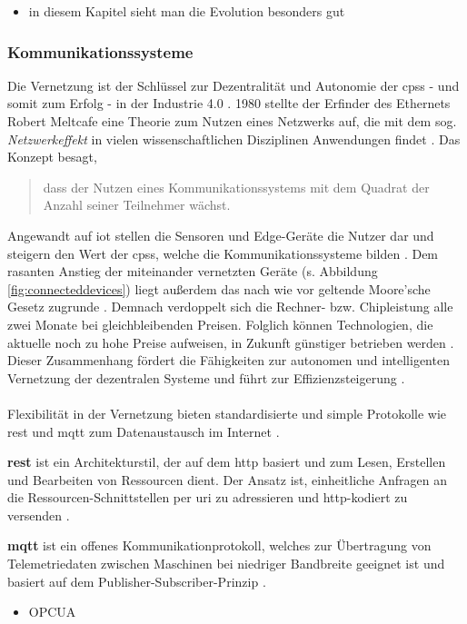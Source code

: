 \begin{itemize}
  \item in diesem Kapitel sieht man die Evolution besonders gut
\end{itemize}

\subsubsection{Kommunikationssysteme}

Die Vernetzung ist der Schlüssel zur Dezentralität und Autonomie der \ac{cpss} - und somit zum Erfolg - in der Industrie 4.0 \citep{Bauernhansl2014}. 1980 stellte der Erfinder des Ethernets Robert Meltcafe eine Theorie zum Nutzen eines Netzwerks auf, die mit dem sog. \textit{Netzwerkeffekt} in vielen wissenschaftlichen Disziplinen Anwendungen findet \citep{Lea2018}. Das Konzept besagt,

\begin{quotation}
  \glqq [...] dass der Nutzen eines Kommunikationssystems mit dem Quadrat der Anzahl seiner Teilnehmer wächst.\grqq{} \citep[S. 18]{Bauernhansl2014}
\end{quotation}

Angewandt auf \ac{iot} stellen die Sensoren und Edge-Geräte die Nutzer dar und steigern den Wert der \ac{cpss}, welche die Kommunikationssysteme bilden \citep{Lea2018}. Dem rasanten Anstieg der  miteinander vernetzten Geräte (s. Abbildung \ref{fig:connecteddevices}) liegt außerdem das nach wie vor geltende Moore'sche Gesetz zugrunde \citep{Barthelmaes2017}. Demnach verdoppelt sich die Rechner- bzw. Chipleistung alle zwei Monate bei gleichbleibenden Preisen. Folglich können Technologien, die aktuelle noch zu hohe Preise aufweisen, in Zukunft günstiger betrieben werden \citep{Bauernhansl2014}. Dieser Zusammenhang fördert die Fähigkeiten zur autonomen und intelligenten Vernetzung der dezentralen Systeme und führt zur Effizienzsteigerung \citep{Barthelmaes2017}.
\\\\
Flexibilität in der Vernetzung bieten standardisierte und simple Protokolle wie \ac{rest} und \ac{mqtt} zum Datenaustausch im Internet \citep{Hnisch2017}.

\textbf{\ac{rest}} ist ein Architekturstil, der auf dem \ac{http} basiert und zum Lesen, Erstellen und Bearbeiten von Ressourcen dient. Der Ansatz ist, einheitliche Anfragen an die Ressourcen-Schnittstellen per \ac{uri} zu adressieren und \ac{http}-kodiert zu versenden \citep{Sendler2016}.

\textbf{\ac{mqtt}} ist ein offenes Kommunikationprotokoll, welches zur Übertragung von Telemetriedaten zwischen Maschinen bei niedriger Bandbreite geeignet ist und basiert auf dem Publisher-Subscriber-Prinzip \citep{Lea2018}.
\begin{itemize}
  \item OPCUA
\end{itemize}
